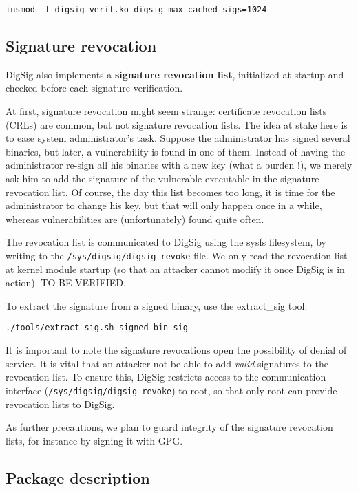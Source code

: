 \documentclass{article}
\begin{document}
\small
\begin{verbatim}
insmod -f digsig_verif.ko digsig_max_cached_sigs=1024
\end{verbatim}
\normalsize

\subsection{Signature revocation}
\label{sec:revocation}

DigSig also implements a {\bf signature revocation list}, initialized
at startup and checked before each signature verification.

At first, signature revocation might seem strange: certificate revocation
lists (CRLs) are common, but not signature revocation lists. 
The idea at stake here is to ease system administrator's task. Suppose the
administrator has signed several binaries, but later, a vulnerability is found
in one of them. Instead of having the administrator re-sign all his binaries
with a new key (what a burden !), we merely ask him to add the signature of the
vulnerable executable in the signature revocation list.
Of course, the day this list becomes too long, it is time for the administrator
to change his key, but that will only happen once in a while, whereas vulnerabilities
are (unfortunately) found quite often.

The revocation list  is  communicated to DigSig  using the sysfs filesystem,
by writing to the {\tt /sys/digsig/digsig\_revoke} file.
We only read the revocation list at kernel module startup (so that an attacker
cannot modify it once DigSig is in action). TO BE VERIFIED.

To extract the signature from a signed binary, use the extract\_sig tool:
\small
\begin{verbatim}
./tools/extract_sig.sh signed-bin sig
\end{verbatim}
\normalsize

It is important to note the signature revocations open the possibility of denial of service. 
It is vital that an attacker not be able to add {\it valid} signatures
to the revocation list. To ensure this, DigSig restricts access to
the communication interface ({\tt /sys/digsig/digsig\_revoke}) to root, so that
only root can provide revocation lists to DigSig.


As further precautions, we plan to guard integrity of the signature revocation
lists, for instance by signing it with GPG.

\subsection{Package description}
\label{sec:package}
\end{document}
